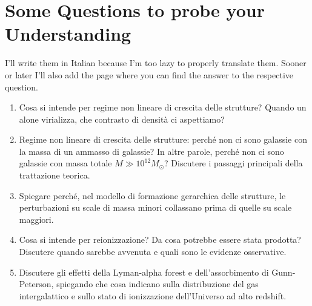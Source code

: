 \newpage
\section*{Some Questions to probe your Understanding}

I'll write them in Italian because I'm too lazy to properly translate them. Sooner or later I'll also add the page where you can find the answer to the respective question.

\begin{enumerate}
    \item  Cosa si intende per regime non lineare di crescita delle strutture? Quando un alone virializza, che contrasto di densità ci aspettiamo?
    \item Regime non lineare di crescita delle strutture: perché non ci sono galassie con la massa di un ammasso di galassie? In altre parole, perché non ci sono galassie con massa totale $M \gg 10^{12}M_{\odot}$? Discutere i passaggi principali della trattazione teorica.
    \item Spiegare perché, nel modello di formazione gerarchica delle strutture, le perturbazioni su scale di massa minori collassano prima di quelle su scale maggiori.
    \item Cosa si intende per reionizzazione? Da cosa potrebbe essere stata prodotta? Discutere quando sarebbe avvenuta e quali sono le evidenze osservative.
    \item Discutere gli effetti della Lyman-alpha forest e dell’assorbimento di Gunn-Peterson, spiegando che cosa indicano sulla distribuzione del gas intergalattico e sullo stato di ionizzazione dell’Universo ad alto redshift.
\end{enumerate}